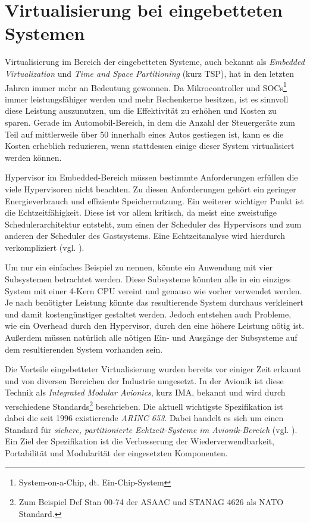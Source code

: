 \documentclass[
  a4paper,					    %
  twoside,
  DIV=calc,     				%
  bibliography=totoc,
  cleardoublepage=empty,
  ngerman,     					%
  final       					%
]{scrbook}
\begin{document}
\section{Virtualisierung bei eingebetteten Systemen}
\label{sec:EVirtualisierung}
Virtualisierung im Bereich der eingebetteten Systeme, auch bekannt als \emph{Embedded Virtualization} und \emph{Time and Space Partitioning} (kurz TSP), hat in den letzten Jahren immer mehr an Bedeutung gewonnen. Da Mikrocontroller und SOCs\footnote{System-on-a-Chip, dt. Ein-Chip-System} immer leistungsfähiger werden und mehr Rechenkerne besitzen, ist es sinnvoll diese Leistung auszunutzen, um die Effektivität zu erhöhen und Kosten zu sparen. Gerade im Automobil-Bereich, in dem die Anzahl der Steuergeräte zum Teil auf mittlerweile über 50 innerhalb eines Autos gestiegen ist, kann es die Kosten erheblich reduzieren, wenn stattdessen einige dieser System virtualisiert werden können.

Hypervisor im Embedded-Bereich müssen bestimmte Anforderungen erfüllen die viele Hypervisoren nicht beachten. Zu diesen Anforderungen gehört ein geringer Energieverbrauch und effiziente Speichernutzung. Ein weiterer wichtiger Punkt ist die Echtzeitfähigkeit. Diese ist vor allem kritisch, da meist eine zweistufige Schedulerarchitektur entsteht, zum einen der Scheduler des Hypervisors und zum anderen der Scheduler des Gastsystems. Eine Echtzeitanalyse wird hierdurch verkompliziert (vgl. \cite{two_lvl_sched}).

Um nur ein einfaches Beispiel zu nennen, könnte ein Anwendung mit vier Subsystemen betrachtet werden. Diese Subsysteme könnten alle in ein einziges System mit einer 4-Kern CPU vereint und genauso wie vorher verwendet werden. Je nach benötigter Leistung könnte das resultierende System durchaus verkleinert und damit kostengünstiger gestaltet werden. Jedoch entstehen auch Probleme, wie ein Overhead durch den Hypervisor, durch den eine höhere Leistung nötig ist. Außerdem müssen natürlich alle nötigen Ein- und Ausgänge der Subsysteme auf dem resultierenden System vorhanden sein.

Die Vorteile eingebetteter Virtualisierung wurden bereits vor einiger Zeit erkannt und von diversen Bereichen der Industrie umgesetzt. In der Avionik ist diese Technik als \emph{Integrated Modular Avionics}, kurz IMA, bekannt und wird durch verschiedene Standards\footnote{Zum Beispiel Def Stan 00-74 der ASAAC und STANAG 4626 als NATO Standard.} beschrieben. Die aktuell wichtigste Spezifikation ist dabei die seit 1996 existierende \emph{ARINC 653}. Dabei handelt es sich um einen Standard für \emph{sichere, partitionierte Echtzeit-Systeme im Avionik-Bereich} (vgl. \cite{arinc653_wr}). Ein Ziel der Spezifikation ist die Verbesserung der Wiederverwendbarkeit, Portabilität und Modularität der eingesetzten Komponenten.
\end{document}
